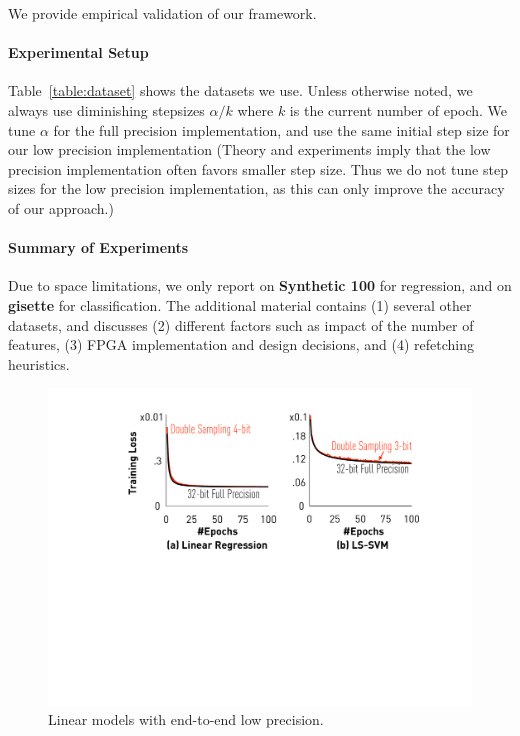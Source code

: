 \documentclass{article}
\begin{document}
\vspace{-0.5em}
We provide empirical validation of
our framework.

\vspace{-1em}
\paragraph{Experimental Setup} 
Table~\ref{table:dataset} shows the 
datasets we use. 
Unless otherwise noted, we always
use diminishing stepsizes $\alpha/k$
where $k$ is the current number of
epoch. We tune 
$\alpha$ for the full precision
implementation, and use the
same initial step size for 
our low precision 
implementation (Theory and
experiments imply that the low precision
implementation often favors smaller step size. 
Thus we do not tune step sizes for the low precision 
implementation, as this can only improve the accuracy of our approach.) 

\vspace{-1em}
\paragraph*{Summary of Experiments}
Due to space limitations, we only report on {\bf Synthetic 100} for regression, and on 
{\bf gisette} for classification. 
The additional material contains (1) several other datasets, 
and discusses (2) different
factors such as impact of the number of features, 
(3) FPGA implementation and design
decisions, and (4) refetching heuristics.


\begin{figure}[t]
\centering
\includegraphics[width=0.7\columnwidth]{final-experiments/linearmodel} 
\vspace{-1em}
\caption{Linear models with end-to-end low precision.}
\vspace{-1.5em}
\label{fig:convergence}
\end{figure}
\end{document}
